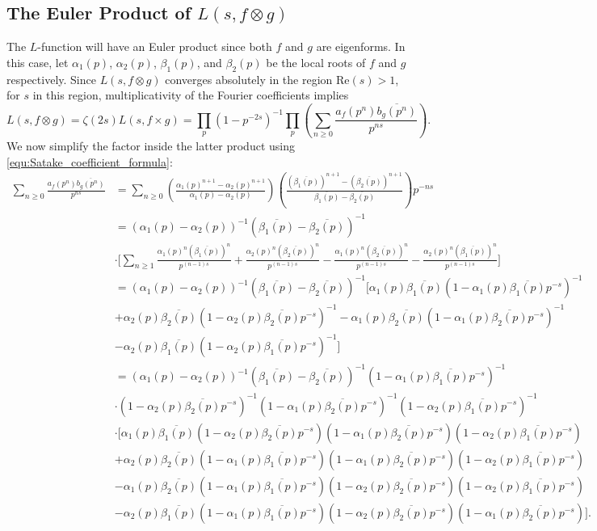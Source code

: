 \documentclass[12pt]{book}
\theoremstyle{definition}\newframedtheorem{method}{Method}
\renewcommand{\a}{\alpha}
\renewcommand{\b}{\beta}
\newcommand{\z}{\zeta}
\newcommand{\x}{\times}
\newcommand{\ox}{\otimes}
\newcommand{\<}{\langle}
\renewcommand{\>}{\rangle}
\newcommand{\conj}{\overline}
\renewcommand{\Re}{\mathrm{Re}}
\begin{document}
    \subsection*{The Euler Product of \texorpdfstring{$L(s,f \ox g)$}{L(s,fxg)}}
      The $L$-function will have an Euler product since both $f$ and $g$ are eigenforms. In this case, let $\a_{1}(p)$, $\a_{2}(p)$, $\b_{1}(p)$, and $\b_{2}(p)$ be the local roots of $f$ and $g$ respectively. Since $L(s,f \ox g)$ converges absolutely in the region $\Re(s) > 1$, for $s$ in this region, multiplicativity of the Fourier coefficients implies
      \[
        L(s,f \ox g) = \z(2s)L(s,f \x g) = \prod_{p}(1-p^{-2s})^{-1}\prod_{p}\left(\sum_{n \ge 0}\frac{a_{f}(p^{n})\conj{b_{g}(p^{n})}}{p^{ns}}\right).
      \]
      We now simplify the factor inside the latter product using \cref{equ:Satake_coefficient_formula}:
      \begingroup
        \allowdisplaybreaks
        \begin{align*}
          \sum_{n \ge 0}\frac{a_{f}(p^{n})\conj{b_{g}(p^{n})}}{p^{ns}} &= \sum_{n \ge 0}\left(\frac{\a_{1}(p)^{n+1}-\a_{2}(p)^{n+1}}{\a_{1}(p)-\a_{2}(p)}\right)\left(\frac{(\conj{\b_{1}(p)})^{n+1}-(\conj{\b_{2}(p)})^{n+1}}{\conj{\b_{1}(p)}-\conj{\b_{2}(p)}}\right)p^{-ns} \\
          &= (\a_{1}(p)-\a_{2}(p))^{-1}(\conj{\b_{1}(p)}-\conj{\b_{2}(p)})^{-1} \\
          &\cdot \bigg[\sum_{n \ge 1}\frac{\a_{1}(p)^{n}(\conj{\b_{1}(p)})^{n}}{p^{(n-1)s}}+\frac{\a_{2}(p)^{n}(\conj{\b_{2}(p)})^{n}}{p^{(n-1)s}}-\frac{\a_{1}(p)^{n}(\conj{\b_{2}(p)})^{n}}{p^{(n-1)s}}-\frac{\a_{2}(p)^{n}(\conj{\b_{1}(p)})^{n}}{p^{(n-1)s}}\bigg] \\
          &= (\a_{1}(p)-\a_{2}(p))^{-1}(\conj{\b_{1}(p)}-\conj{\b_{2}(p)})^{-1}\bigg[\a_{1}(p)\conj{\b_{1}(p)}(1-\a_{1}(p)\conj{\b_{1}(p)}p^{-s})^{-1} \\
          &+\a_{2}(p)\conj{\b_{2}(p)}(1-\a_{2}(p)\conj{\b_{2}(p)}p^{-s})^{-1}-\a_{1}(p)\conj{\b_{2}(p)}(1-\a_{1}(p)\conj{\b_{2}(p)}p^{-s})^{-1} \\
          &-\a_{2}(p)\conj{\b_{1}(p)}(1-\a_{2}(p)\conj{\b_{1}(p)}p^{-s})^{-1}\bigg] \\
          &= (\a_{1}(p)-\a_{2}(p))^{-1}(\conj{\b_{1}(p)}-\conj{\b_{2}(p)})^{-1}(1-\a_{1}(p)\conj{\b_{1}(p)}p^{-s})^{-1} \\
          &\cdot(1-\a_{2}(p)\conj{\b_{2}(p)}p^{-s})^{-1}(1-\a_{1}(p)\conj{\b_{2}(p)}p^{-s})^{-1}(1-\a_{2}(p)\conj{\b_{1}(p)}p^{-s})^{-1} \\
          &\cdot\bigg[\a_{1}(p)\conj{\b_{1}(p)}(1-\a_{2}(p)\conj{\b_{2}(p)}p^{-s})(1-\a_{1}(p)\conj{\b_{2}(p)}p^{-s})(1-\a_{2}(p)\conj{\b_{1}(p)}p^{-s}) \\
          &+\a_{2}(p)\conj{\b_{2}(p)}(1-\a_{1}(p)\conj{\b_{1}(p)}p^{-s})(1-\a_{1}(p)\conj{\b_{2}(p)}p^{-s})(1-\a_{2}(p)\conj{\b_{1}(p)}p^{-s}) \\
          &-\a_{1}(p)\conj{\b_{2}(p)}(1-\a_{1}(p)\conj{\b_{1}(p)}p^{-s})(1-\a_{2}(p)\conj{\b_{2}(p)}p^{-s})(1-\a_{2}(p)\conj{\b_{1}(p)}p^{-s}) \\
          &-\a_{2}(p)\conj{\b_{1}(p)}(1-\a_{1}(p)\conj{\b_{1}(p)}p^{-s})(1-\a_{2}(p)\conj{\b_{2}(p)}p^{-s})(1-\a_{1}(p)\conj{\b_{2}(p)}p^{-s})\bigg].
        \end{align*}
\end{document}
